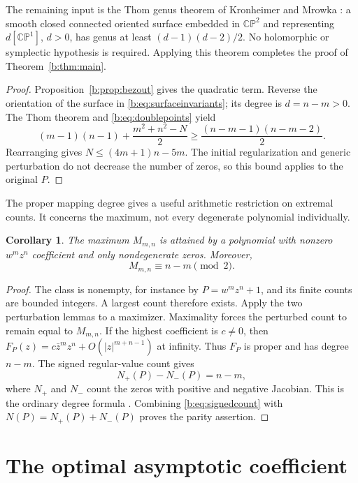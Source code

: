 \documentclass[UTF8,11pt]{ctexart}
\newtheorem{cor}[thm]{Corollary}
\theoremstyle{definition}
\numberwithin{equation}{section}
\newcommand{\CP}{\mathbb {CP}}\newcommand{\cP}{\mathcal P}
\begin{document}
The remaining input is the Thom genus theorem of Kronheimer and
Mrowka \cite[Theorem~1, \av, p.~1]{KM94}: a smooth closed connected
oriented surface embedded in $\CP^2$ and representing
$d[\CP^1]$, $d>0$, has genus at least $(d-1)(d-2)/2$.
No holomorphic or symplectic hypothesis is required. Applying this
theorem completes the proof of Theorem~\ref{b:thm:main}.

\begin{proof}
Proposition~\ref{b:prop:bezout} gives the quadratic term.
Reverse the orientation of the surface in
\eqref{b:eq:surfaceinvariants}; its degree is $d=n-m>0$.
The Thom theorem and \eqref{b:eq:doublepoints} yield
\[
 (m-1)(n-1)+\frac{m^2+n^2-N}{2}
 \ge\frac{(n-m-1)(n-m-2)}2.
\]
Rearranging gives $N\le(4m+1)n-5m$. The initial regularization and
generic perturbation do not decrease the number of zeros, so this
bound applies to the original $P$.
\end{proof}

The proper mapping degree gives a useful arithmetic restriction on
extremal counts. It concerns the maximum, not every degenerate
polynomial individually.
\begin{cor}\label{b:cor:parity}
The maximum $M_{m,n}$ is attained by a polynomial with nonzero
$w^mz^n$ coefficient and only nondegenerate zeros. Moreover,
\[
 M_{m,n}\equiv n-m\pmod2.
\]
\end{cor}
\begin{proof}
The class is nonempty, for instance by $P=w^mz^n+1$, and its finite
counts are bounded integers. A largest count therefore exists.
Apply the two perturbation lemmas to a maximizer. Maximality forces
the perturbed count to remain equal to $M_{m,n}$.
If the highest coefficient is $c\ne0$, then
$F_P(z)=c\bar z^mz^n+O(|z|^{m+n-1})$ at infinity.
Thus $F_P$ is proper and has degree $n-m$.
The signed regular-value count gives
\begin{equation}\label{b:eq:signedcount}
 N_+(P)-N_-(P)=n-m,
\end{equation}
where $N_+$ and $N_-$ count the zeros with positive and negative
Jacobian. This is the ordinary degree formula
\cite[Chapter~5, Section~1]{Hir76}.
Combining \eqref{b:eq:signedcount} with
$N(P)=N_+(P)+N_-(P)$ proves the parity assertion.
\end{proof}

\section{The optimal asymptotic coefficient}\label{b:sec:radial}
\end{document}
